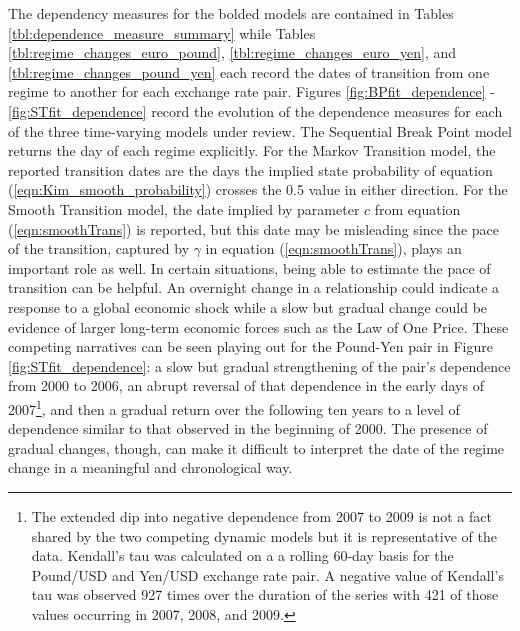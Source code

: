 The dependency measures for the bolded models are contained in Tables \ref{tbl:dependence_measure_summary} while Tables \ref{tbl:regime_changes_euro_pound}, \ref{tbl:regime_changes_euro_yen}, and \ref{tbl:regime_changes_pound_yen} each record the dates of transition from one regime to another for each exchange rate pair. Figures \ref{fig:BPfit_dependence} - \ref{fig:STfit_dependence} record the evolution of the dependence measures for each of the three time-varying models under review. The Sequential Break Point model returns the day of each regime explicitly. For the Markov Transition model, the reported transition dates are the days the implied state probability of equation (\ref{eqn:Kim_smooth_probability}) crosses the 0.5 value in either direction. For the Smooth Transition model, the date implied by parameter $c$ from equation (\ref{eqn:smoothTrans}) is reported, but this date may be misleading since the pace of the transition, captured by $\gamma$ in equation (\ref{eqn:smoothTrans}), plays an important role as well. In certain situations, being able to estimate the pace of transition can be helpful. An overnight change in a relationship could indicate a response to a global economic shock while a slow but gradual change could be evidence of larger long-term economic forces such as the Law of One Price. These competing narratives can be seen playing out for the Pound-Yen pair in Figure \ref{fig:STfit_dependence}: a slow but gradual strengthening of the pair's dependence from 2000 to 2006, an abrupt reversal of that dependence in the early days of 2007\footnote{The extended dip into negative dependence from 2007 to 2009 is not a fact shared by the two competing dynamic models but it is representative of the data. Kendall's tau was calculated on a a rolling 60-day basis for the Pound/USD and Yen/USD exchange rate pair. A negative value of Kendall's tau was observed 927 times over the duration of the series with 421 of those values occurring in 2007, 2008, and 2009.}, and then a gradual return over the following ten years to a level of dependence similar to that observed in the beginning of 2000. The presence of gradual changes, though, can make it difficult to interpret the date of the regime change in a meaningful and chronological way. 

